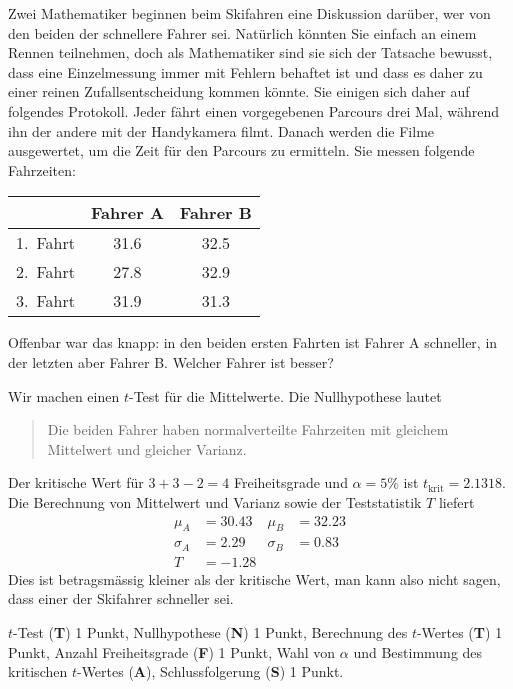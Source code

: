 Zwei Mathematiker beginnen beim Skifahren eine Diskussion darüber, 
wer von den beiden der schnellere Fahrer sei.
Natürlich könnten Sie einfach an einem Rennen teilnehmen, doch
als Mathematiker sind sie sich der Tatsache bewusst, dass eine
Einzelmessung immer mit Fehlern behaftet ist und dass es daher
zu einer reinen Zufallsentscheidung kommen könnte. Sie einigen sich daher
auf folgendes Protokoll. Jeder fährt einen vorgegebenen Parcours
drei Mal, während ihn der andere mit der Handykamera filmt.
Danach werden die Filme ausgewertet, um die Zeit für den Parcours
zu ermitteln. Sie messen folgende Fahrzeiten:
\begin{center}
\begin{tabular}{|l|c|c|}
\hline
        &Fahrer A&Fahrer B\\
\hline
1.~Fahrt&  31.6  &  32.5  \\
2.~Fahrt&  27.8  &  32.9  \\
3.~Fahrt&  31.9  &  31.3  \\
\hline
\end{tabular}
\end{center}
Offenbar war das knapp: in den beiden ersten Fahrten ist Fahrer A schneller,
in der letzten aber Fahrer B.
Welcher Fahrer ist besser?


\begin{loesung}
Wir machen einen $t$-Test für die Mittelwerte.
Die Nullhypothese lautet
\begin{quote}
Die beiden Fahrer haben normalverteilte Fahrzeiten mit gleichem
Mittelwert und gleicher Varianz.
\end{quote}
Der kritische Wert für $3+3-2=4$ Freiheitsgrade und $\alpha=5\%$
ist $t_{\text{krit}}=2.1318$.
Die Berechnung von Mittelwert und Varianz sowie der Teststatistik $T$
liefert
\begin{align*}
\mu_A&=30.43
&
\mu_B&=32.23
\\
\sigma_A&=2.29
&
\sigma_B&=0.83
\\
T&=-1.28
\end{align*}
Dies ist betragsmässig kleiner als der kritische Wert,
man kann also nicht sagen, dass einer der Skifahrer schneller sei.
\end{loesung}

\begin{bewertung}
$t$-Test ({\bf T}) 1 Punkt,
Nullhypothese ({\bf N}) 1 Punkt,
Berechnung des $t$-Wertes ({\bf T}) 1 Punkt,
Anzahl Freiheitsgrade ({\bf F}) 1 Punkt,
Wahl von $\alpha$ und Bestimmung des kritischen $t$-Wertes ({\bf A}),
Schlussfolgerung ({\bf S}) 1 Punkt.
\end{bewertung}

